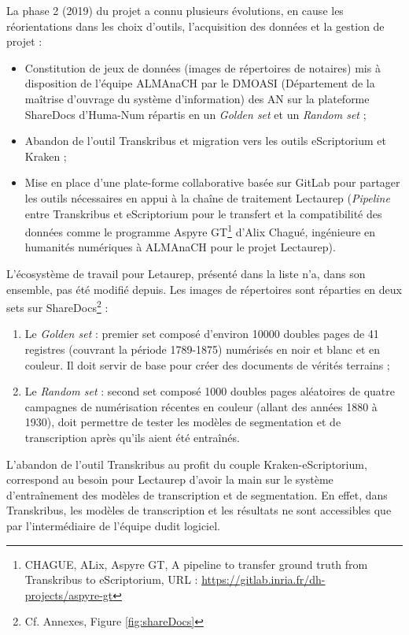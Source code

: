 La phase 2 (2019) du projet a connu plusieurs évolutions, en cause les réorientations dans les choix d'outils, l'acquisition des données et la gestion de projet :
\begin{itemize}
    \item Constitution de jeux de données (images de répertoires de notaires) mis à disposition de l'équipe ALMAnaCH par le DMOASI (Département de la maîtrise d’ouvrage du système d’information) des AN sur la plateforme ShareDocs d'Huma-Num répartis en un \textit{Golden set} et un \textit{Random set} ;
    \item Abandon de l'outil Transkribus et migration vers les outils eScriptorium et Kraken ;
    \item Mise en place d'une plate-forme collaborative basée sur GitLab pour partager les outils nécessaires en appui à la chaîne de traitement Lectaurep (\textit{Pipeline} entre Transkribus et eScriptorium pour le transfert et la compatibilité des données comme le programme Aspyre GT\footnote{CHAGUE, ALix, Aspyre GT, A pipeline to transfer ground truth from Transkribus to eScriptorium, URL : \url{https://gitlab.inria.fr/dh-projects/aspyre-gt}} d'Alix Chagué, ingénieure en humanités numériques à ALMAnaCH pour le projet Lectaurep).
\end{itemize}
\bigskip
L'écosystème de travail pour Letaurep, présenté dans la liste n'a, dans son ensemble, pas été modifié depuis. Les images de répertoires sont réparties en deux sets sur ShareDocs\footnote{Cf. Annexes, Figure \ref{fig:shareDocs}} :
\begin{enumerate}
    \item Le \textit{Golden set} :  premier set composé d'environ 10000 doubles pages de 41 registres (couvrant la période 1789-1875) numérisés en noir et blanc et en couleur. Il doit servir de base pour créer des documents de vérités terrains ;
    \item Le \textit{Random set} : second set composé 1000 doubles pages aléatoires de quatre campagnes de numérisation récentes en couleur (allant des années 1880 à 1930), doit permettre de tester les modèles de segmentation et de transcription après qu'ils aient été entraînés.
\end{enumerate}
\bigskip
L'abandon de l'outil Transkribus au profit du couple Kraken-eScriptorium, correspond au besoin pour Lectaurep d'avoir la main sur le système d'entraînement des modèles de transcription et de segmentation. En effet, dans Transkribus, les modèles de transcription et les résultats ne sont accessibles que par l’intermédiaire de l'équipe dudit logiciel.

